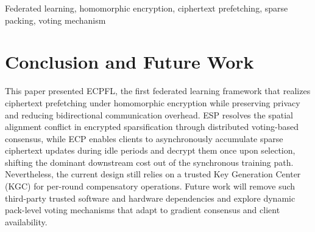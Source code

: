 \begin{abstract}

Cross-device federated learning (FL) faces substantial limitations due to the significant communication burden associated with exchanging model updates between a central server and heterogeneous, bandwidth-limited edge devices.
Although upstream sparsification and downstream prefetching methods provide partial relief, integrating them into homomorphically encrypted FL creates a fundamental structural conflict: naively encrypting dynamically sparsified updates destroys the strict spatial alignment required by Single Instruction Multiple Data (SIMD), which effectively negates any expected communication benefits.
To address these issues, we propose ECPFL, a secure framework based on CKKS homomorphic encryption that systematically optimizes both upstream and downstream communication.
First, to support upstream efficiency, we develop Efficient Sparse Packing (ESP). ESP harmonizes sparsification with SIMD slot constraints via a distributed voting mechanism for pack-level selection, guaranteeing spatial alignment across clients.
Building upon this, we introduce Efficient Ciphertext Prefetching (ECP) to tackle downstream latency. ECP enables asynchronous prefetching in the encrypted domain by aggregating sparse updates during client idle periods, drastically reducing synchronous communication while strictly preserving IND-CPA security.
Comprehensive evaluations across four standard datasets demonstrate that ECPFL preserves baseline model accuracy within 1\% while reducing total bidirectional communication overhead by 2.5--10.8$\times$ and accelerating end-to-end training by 1.2--5.7$\times$.

\end{abstract}

\begin{IEEEkeywords}
Federated learning, homomorphic encryption, ciphertext prefetching, sparse packing, voting mechanism
\end{IEEEkeywords}

\section{Conclusion and Future Work}
\label{sec:conclusion}

This paper presented \textsc{ECPFL}, the first federated learning framework that realizes ciphertext prefetching under homomorphic encryption while preserving privacy and reducing bidirectional communication overhead.
ESP resolves the spatial alignment conflict in encrypted sparsification through distributed voting-based consensus, while ECP enables clients to asynchronously accumulate sparse ciphertext updates during idle periods and decrypt them once upon selection, shifting the dominant downstream cost out of the synchronous training path.
Nevertheless, the current design still relies on a trusted Key Generation Center (KGC) for per-round compensatory operations.
Future work will remove such third-party trusted software and hardware dependencies and explore dynamic pack-level voting mechanisms that adapt to gradient consensus and client availability.
